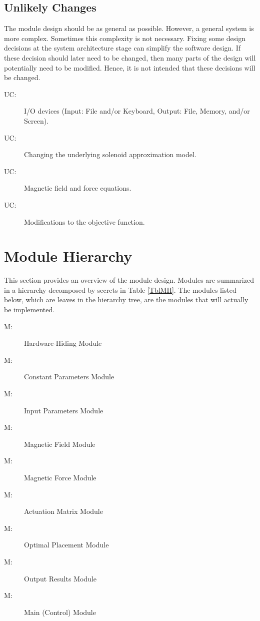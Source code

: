 \documentclass[12pt, titlepage]{article}
\newcounter{ucnum}
\newcommand{\uctheucnum}{UC\theucnum}
\newcounter{mnum}
\newcommand{\mthemnum}{M\themnum}
\begin{document}
\subsection{Unlikely Changes} \label{SecUchange}

The module design should be as general as possible. However, a general system is
more complex. Sometimes this complexity is not necessary. Fixing some design
decisions at the system architecture stage can simplify the software design. If
these decision should later need to be changed, then many parts of the design
will potentially need to be modified. Hence, it is not intended that these
decisions will be changed.

\begin{description}
\item[ \uctheucnum \label{ucIO}:] I/O devices
  (Input: File and/or Keyboard, Output: File, Memory, and/or Screen).
  \item[ \uctheucnum \label{ucSolApprox}:] Changing the underlying solenoid approximation model.
  \item[ \uctheucnum \label{ucFieldForce}:] Magnetic field and force equations.
  \item[ \uctheucnum \label{ucObjFunc}:] Modifications to the objective function. 
\end{description}

\section{Module Hierarchy} \label{SecMH}

This section provides an overview of the module design. Modules are summarized
in a hierarchy decomposed by secrets in Table \ref{TblMH}. The modules listed
below, which are leaves in the hierarchy tree, are the modules that will
actually be implemented.

\begin{description}
\item [ \mthemnum \label{mHH}:] Hardware-Hiding Module
\item [ \mthemnum \label{mConsParams}:] Constant Parameters Module
\item [ \mthemnum \label{mInputParams}:] Input Parameters Module
\item [ \mthemnum \label{mMagField}:] Magnetic Field Module
\item [ \mthemnum \label{mMagForce}:] Magnetic Force Module
\item [ \mthemnum \label{mActMatrix}:] Actuation Matrix Module
\item [ \mthemnum \label{mOptPlacement}:] Optimal Placement Module
\item [ \mthemnum \label{mResults}:] Output Results Module
\item [ \mthemnum \label{mControl}:] Main (Control) Module
\end{description}
\end{document}
